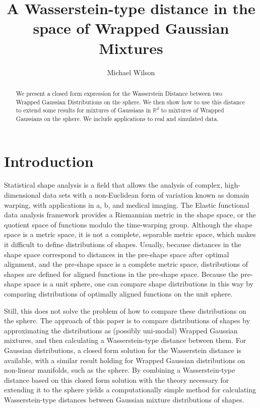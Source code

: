 \documentclass[]{article}
\title{A Wasserstein-type distance in the space of Wrapped Gaussian Mixtures}
\author{Michael Wilson}
\date{}
\begin{document}
	
	\maketitle
	
	\begin{abstract}
	We present a closed form expression for the Wasserstein Distance between two Wrapped Gaussian Distributions on the sphere. We then show how to use this distance to extend some results for mixtures of Gaussians in $\mathbb{R}^d$ to mixtures of Wrapped Gaussians on the sphere. We include applications to real and simulated data. 
	\end{abstract}

\section{Introduction}

Statistical shape analysis is a field that allows the analysis of complex, high-dimensional data sets with a non-Euclidean form of variation known as domain warping, with applications in a, b, and medical imaging. The Elastic functional data analysis framework provides a Riemannian metric in the shape space, or the quotient space of functions modulo the time-warping group. Although the shape space is a metric space, it is not a complete, separable metric space, which makes it difficult to define distributions of shapes. Usually, because distances in the shape space correspond to distances in the pre-shape space after optimal alignment, and the pre-shape space is a complete metric space, distributions of shapes are defined for aligned functions in the pre-shape space. Because the pre-shape space is a unit sphere, one can compare shape distributions in this way by comparing distributions of optimally aligned functions on the unit sphere. 

Still, this does not solve the problem of how to compare these distributions on the sphere. The approach of this paper is to compare distributions of shapes by approximating the distributions as (possibly uni-modal) Wrapped Gaussian mixtures, and then calculating a Wasserstein-type distance between them. For Gaussian distributions, a closed form solution for the Wasserstein distance is available, with a similar result holding for Wrapped Gaussian distributions on non-linear manifolds, such as the sphere. By combining a Wasserstein-type distance based on this closed form solution with the theory necessary for extending it to the sphere yields a computationally simple method for calculating Wasserstein-type distances between Gaussian mixture distributions of shapes.    
\end{document}
